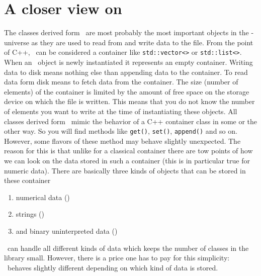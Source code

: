 \section{A closer view on \nxfield}\label{section:nxfield_design}
The classes derived form \nxfield\ are most probably the most important 
objects in the \pninx-universe as they are used to read from and write data to 
the file. From the point of C++, \nxfield\ can be considered a container like 
{\tt std::vector<>} or {\tt std::list<>}.
When an \nxfield\ object is newly instantiated it represents an empty container. 
Writing data to disk means nothing else than appending data to the container. 
To read data form disk means to fetch data from the container.
The size (number of elements) of the container is limited by the amount of 
free space on the storage device on which the file is written.
This means that you do not know the number of elements you want to write 
at the time of instantiating these objects. 
All classes derived form \nxfield\ mimic the behavior of a C++ container 
class in some or the other way.  So you will find methods like 
{\tt get()}, {\tt set()}, {\tt append()} and so on. However, some flavors
of these method may behave slightly unexpected. The reason for this is that 
unlike for a classical container there are tow points of how we can look 
on the data stored in such a container (this is in particular true for 
numeric data). 
There are basically three kinds of objects that can be stored in these container
\begin{enumerate}
  \item numerical data (\nxnumericfield)
  \item strings (\nxstringfield)
  \item and binary uninterpreted data (\nxbinaryfield)
\end{enumerate}
\nxfield\ can handle all different kinds of data which keeps the number of 
classes in the library small. However, there is a price one has to pay 
for this simplicity: \nxfield\ behaves slightly different depending 
on which kind of data is stored. 

